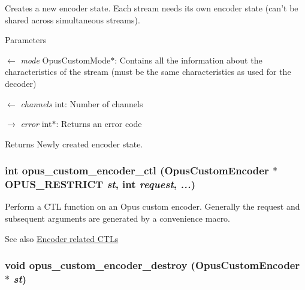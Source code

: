 Creates a new encoder state. Each stream needs its own encoder state (can't be shared across simultaneous streams). 
\begin{DoxyParams}{Parameters}
\item[\mbox{$\leftarrow$} {\em mode}]{\ttfamily OpusCustomMode$\ast$}: Contains all the information about the characteristics of the stream (must be the same characteristics as used for the decoder) \item[\mbox{$\leftarrow$} {\em channels}]{\ttfamily int}: Number of channels \item[\mbox{$\rightarrow$} {\em error}]{\ttfamily int$\ast$}: Returns an error code \end{DoxyParams}
\begin{DoxyReturn}{Returns}
Newly created encoder state. 
\end{DoxyReturn}
\hypertarget{group__opus__custom_gacf3d854e681cae3b693ee56b54459226}{
\subsubsection[{opus\_\-custom\_\-encoder\_\-ctl}]{\setlength{\rightskip}{0pt plus 5cm}int opus\_\-custom\_\-encoder\_\-ctl ({\bf OpusCustomEncoder} $\ast$OPUS\_\-RESTRICT {\em st}, \/  int {\em request}, \/   {\em ...})}}
\label{group__opus__custom_gacf3d854e681cae3b693ee56b54459226}


Perform a CTL function on an Opus custom encoder. Generally the request and subsequent arguments are generated by a convenience macro. \begin{DoxySeeAlso}{See also}
\hyperlink{group__opus__encoderctls}{Encoder related CTLs} 
\end{DoxySeeAlso}
\hypertarget{group__opus__custom_ga5ed5b55bccdc141632d8ba65b8228e7d}{
\subsubsection[{opus\_\-custom\_\-encoder\_\-destroy}]{\setlength{\rightskip}{0pt plus 5cm}void opus\_\-custom\_\-encoder\_\-destroy ({\bf OpusCustomEncoder} $\ast$ {\em st})}}
\label{group__opus__custom_ga5ed5b55bccdc141632d8ba65b8228e7d}


